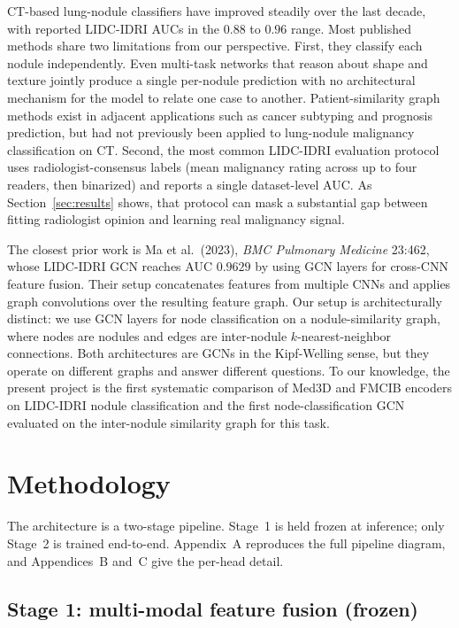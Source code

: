 \documentclass[10pt,letterpaper,twocolumn]{article}
\begin{document}
CT-based lung-nodule classifiers have improved steadily over the last decade, with reported LIDC-IDRI AUCs in the $0.88$ to $0.96$ range. Most published methods share two limitations from our perspective. First, they classify each nodule independently. Even multi-task networks that reason about shape and texture jointly produce a single per-nodule prediction with no architectural mechanism for the model to relate one case to another. Patient-similarity graph methods exist in adjacent applications such as cancer subtyping and prognosis prediction, but had not previously been applied to lung-nodule malignancy classification on CT. Second, the most common LIDC-IDRI evaluation protocol uses radiologist-consensus labels (mean malignancy rating across up to four readers, then binarized) and reports a single dataset-level AUC. As Section~\ref{sec:results} shows, that protocol can mask a substantial gap between fitting radiologist opinion and learning real malignancy signal.

The closest prior work is Ma et al.\ (2023), \textit{BMC Pulmonary Medicine} 23:462, whose LIDC-IDRI GCN reaches AUC $0.9629$ by using GCN layers for cross-CNN feature fusion. Their setup concatenates features from multiple CNNs and applies graph convolutions over the resulting feature graph. Our setup is architecturally distinct: we use GCN layers for node classification on a nodule-similarity graph, where nodes are nodules and edges are inter-nodule $k$-nearest-neighbor connections. Both architectures are GCNs in the Kipf-Welling sense, but they operate on different graphs and answer different questions. To our knowledge, the present project is the first systematic comparison of Med3D and FMCIB encoders on LIDC-IDRI nodule classification and the first node-classification GCN evaluated on the inter-nodule similarity graph for this task.

\section{Methodology}
\label{sec:methodology}

The architecture is a two-stage pipeline. Stage~1 is held frozen at inference; only Stage~2 is trained end-to-end. Appendix~A reproduces the full pipeline diagram, and Appendices~B and~C give the per-head detail.

\subsection{Stage 1: multi-modal feature fusion (frozen)}
\end{document}
